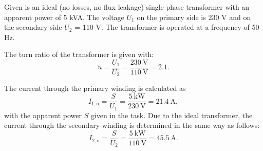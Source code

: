 Given is an ideal (no losses, no flux leakage) single-phase transformer with an apparent power of 5 kVA. The voltage $U_{\mathrm{1}}$ on the primary side is 230 V and on the secondary side $U_{\mathrm{2}}$ = 110 V. The transformer is operated at a frequency of 50 Hz.


\begin{solutionblock}
  The turn ratio of the transformer is given with:
  \begin{equation}
    \ddot{u} = \frac{U_{\mathrm{1}}}{U_{\mathrm{2}}}
    = \frac{\SI{230}{\volt}}{\SI{110}{\volt}}
    = 2.1.
  \end{equation}


\end{solutionblock}



\begin{solutionblock}
  The current through the primary winding is calculated as
  \begin{equation}
    I_{\mathrm{1,n}} = \frac{S}{U_{\mathrm{1}}}
    = \frac{\SI{5}{\kilo \watt}}{\SI{230}{\volt}}
    = \SI{21.4}{\ampere},
  \end{equation}
  with the apparent power $S$ given in the task.
  Due to the ideal transformer, the current through the secondary winding is determined in the same way as follows: 
  \begin{equation}
    I_{\mathrm{2,n}} = \frac{S}{U_{\mathrm{2}}}
    = \frac{\SI{5}{\kilo \watt}}{\SI{110}{\volt}}
    = \SI{45.5}{\ampere}.
  \end{equation}

\end{solutionblock}



